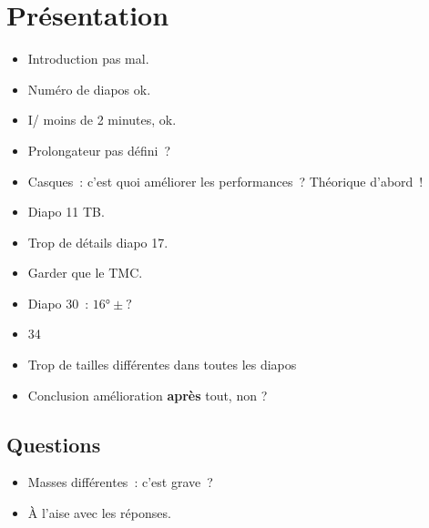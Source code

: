 \documentclass[a4paper, 11pt, final, garamond]{book}
\begin{document}
% 
% 
% 

\section{Présentation}

\begin{itemize}
  \item Introduction pas mal.
  \item Numéro de diapos ok.
  \item I/ moins de 2 minutes, ok.
  \item Prolongateur pas défini~?
  \item Casques~: c'est quoi améliorer les performances~? Théorique d'abord~!
  \item Diapo 11 TB.
  \item Trop de détails diapo 17.
  \item Garder que le TMC.
  \item Diapo 30~: $\ang{16}\pm?$
  \item 34 
  \item Trop de tailles différentes dans toutes les diapos
  \item Conclusion amélioration \textbf{après} tout, non ?
\end{itemize}

\subsection{Questions}
\label{ssec:q}
\begin{itemize}
  \item Masses différentes~: c'est grave~?
  \item À l'aise avec les réponses.
\end{itemize}
\end{document}
